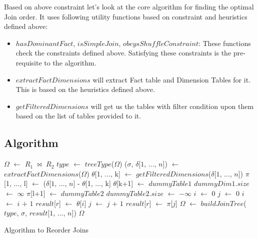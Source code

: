 Based on above constraint let's look at the core algorithm for finding the optimal Join order. It uses following utility functions based on constraint and heuristics defined above:

\begin{itemize}
\item $hasDominantFact$, $isSimpleJoin$, $obeysShuffleConstraint$: These functions check the constraints defined above. Satisfying these constraints is the pre-requisite to the algorithm.
\item $extractFactDimensions$ will extract Fact table and Dimension Tables for it. This is based on the heuristics defined above.
\item $getFilteredDimensions$ will get us the tables with filter condition upon them based on the list of tables provided to it.
\end{itemize}

\subsection{Algorithm}

\begin{algorithm}
\begin{algorithmic}[1]
\STATE  $\Omega$ $\gets$ $R_1$ $\Join$ $R_2$
    \STATE $type$ $\gets$ $treeType$($\Omega$) 
    \STATE ($\sigma$, $\delta$[$1$, $\ldots$, $n$]) $\gets$ $extractFactDimensions$($\Omega$)
    \STATE $\theta$[1, $\ldots$, k] $\gets$ $getFilteredDimensions$($\delta$[$1$, $\ldots$, $n$])
    \STATE $\pi$[1, $\ldots$, l] $\gets$ ($\delta$[$1$, $\ldots$, $n$] - $\theta$[1, $\ldots$, k]
    \STATE $\theta$[k+1] $\gets$ $dummyTable1$
    \STATE $dummyDim1$.$size$ $\gets$ $\infty$
    \STATE $\pi$[l+1] $\gets$ $dummyTable2$
    \STATE $dummyTable2$.$size$ $\gets$ $-\infty$
    \STATE $i$ $\gets$ 0
    \STATE $j$ $\gets$ 0
            \STATE $i$ $\gets$ $i$ $+$ $1$
            \STATE $result$[$r$] $\gets$ $\theta$[$i$]
        \ELSE
            \STATE $j$ $\gets$ $j$ $+$ $1$
            \STATE $result$[$r$] $\gets$ $\pi$[$j$]
        \ENDIF
    \ENDFOR
    \STATE $\Omega$ $\gets$ $buildJoinTree$($type$, $\sigma$, $result$[$1$, $\ldots$, $n$])
\ENDIF
\RETURN $\Omega$
\end{algorithmic}
\label{algorithm}
\caption{Algorithm to Reorder Joins}
\end{algorithm}


